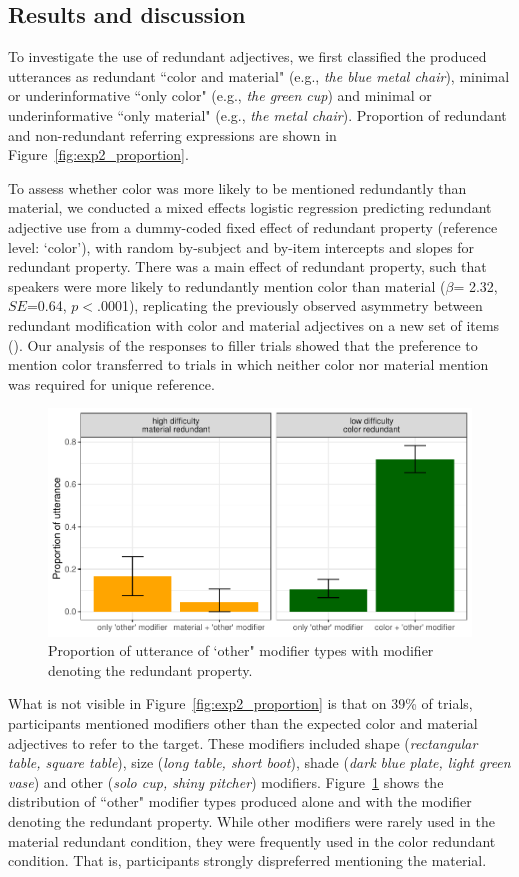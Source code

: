 \documentclass[12pt,letterpaper]{article}
\begin{document}
\subsection{Results and discussion}

To investigate the use of redundant adjectives, we first classified the produced utterances as redundant ``color and material"  (e.g., \textit{the blue metal chair}), minimal or underinformative ``only color" (e.g., \textit{the green cup}) and minimal or underinformative ``only material" (e.g., \textit{the metal chair}). Proportion of redundant  and non-redundant referring expressions are shown in Figure~\ref{fig:exp2_proportion}. 

To assess whether color was more likely to be mentioned redundantly than material, we conducted a mixed effects logistic regression predicting redundant adjective use from a dummy-coded fixed effect of redundant property  (reference level: `color'), with random by-subject and by-item intercepts and slopes for redundant property. There was a main effect of redundant property, such that speakers were more likely to redundantly mention color than material ($\beta$= 2.32, $SE$=0.64, $p$$<$.0001), replicating the previously observed asymmetry between redundant modification with color and material adjectives on a new set of items (\citealt{Sedivy2005,EttingerFernandez2020}). Our analysis of the responses to filler trials showed that the preference to mention color transferred to trials in which neither color nor material mention was required for unique reference.

\begin{figure}[ht]
   \centering
   \includegraphics[width=.8\textwidth]{plots/exp2_other.pdf}
   \caption{Proportion of utterance of `other" modifier types with modifier denoting the redundant property.}
   \label{fig:exp2_other}
   \end{figure}

What is not visible in Figure~\ref{fig:exp2_proportion} is that on 39\% of trials, participants mentioned  modifiers other than the expected color and material adjectives to refer to the target. These modifiers included shape (\textit{rectangular table, square table}), size (\textit{long table, short boot}), shade (\textit{dark blue plate, light green vase}) and other (\textit{solo cup, shiny pitcher}) modifiers. Figure~\ref{fig:exp2_other} shows the distribution of ``other" modifier types produced alone and with the modifier denoting the redundant property. While other modifiers were rarely used in the material redundant condition, they were frequently used in the color redundant condition. That is, participants strongly dispreferred mentioning the material.
\end{document}
